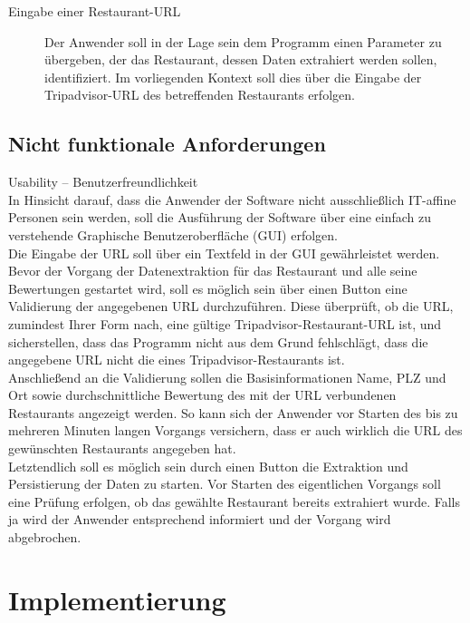 \documentclass[a4paper,oneside,12pt]{report}
\begin{document}
\begin{description}
        \item[Eingabe einer Restaurant-URL] Der Anwender soll in der Lage sein dem Programm einen Parameter zu übergeben, der das Restaurant, dessen Daten extrahiert werden sollen, identifiziert. Im vorliegenden Kontext soll dies über die Eingabe der Tripadvisor-URL des betreffenden Restaurants erfolgen.
        \end{description}

	\section[Nicht funktionale Anforderungen - Skanny Morandi]{Nicht funktionale Anforderungen}
	
		Usability – Benutzerfreundlichkeit\\
        In Hinsicht darauf, dass die Anwender der Software nicht ausschließlich IT-affine Personen sein werden, soll die Ausführung der Software über eine einfach zu verstehende Graphische Benutzeroberfläche (GUI) erfolgen. 
        \\
        Die Eingabe der URL soll über ein Textfeld in der GUI gewährleistet werden. Bevor der Vorgang der Datenextraktion für das Restaurant und alle seine Bewertungen gestartet wird, soll es möglich sein über einen Button eine Validierung der angegebenen URL durchzuführen. Diese überprüft, ob die URL, zumindest Ihrer Form nach, eine gültige Tripadvisor-Restaurant-URL ist, und sicherstellen, dass das Programm nicht aus dem Grund fehlschlägt, dass die angegebene URL nicht die eines Tripadvisor-Restaurants ist.
        \\
        Anschließend an die Validierung sollen die Basisinformationen Name, PLZ und Ort sowie durchschnittliche Bewertung des mit der URL verbundenen Restaurants angezeigt werden. So kann sich der Anwender vor Starten des bis zu mehreren Minuten langen Vorgangs versichern, dass er auch wirklich die URL des gewünschten Restaurants angegeben hat.
        \\
        Letztendlich soll es möglich sein durch einen Button die Extraktion und Persistierung der Daten zu starten. Vor Starten des eigentlichen Vorgangs soll eine Prüfung erfolgen, ob das gewählte Restaurant bereits extrahiert wurde. Falls ja wird der Anwender entsprechend informiert und der Vorgang wird abgebrochen. 
	
	
	
	\chapter{Implementierung}\label{implementierung}
		
\end{document}
